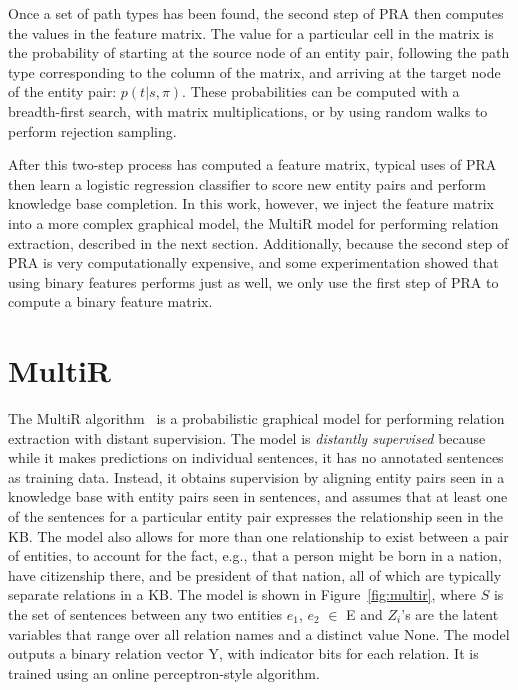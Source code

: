 \documentclass[11pt,a4paper]{article}
\newcommand{\figref}[1]{Figure~\ref{fig:#1}}
\newcommand{\pathtype}{\ensuremath{\pi}}
\begin{document}
Once a set of path types has been found, the second step of PRA then computes
the values in the feature matrix.  The value for a particular cell in the
matrix is the probability of starting at the source node of an entity pair,
following the path type corresponding to the column of the matrix, and arriving
at the target node of the entity pair: $p(t|s,\pathtype)$.  These probabilities
can be computed with a breadth-first search, with matrix multiplications, or by
using random walks to perform rejection sampling.

After this two-step process has computed a feature matrix, typical uses of PRA
then learn a logistic regression classifier to score new entity pairs and
perform knowledge base completion.  In this work, however, we inject the
feature matrix into a more complex graphical model, the MultiR model for
performing relation extraction, described in the next section.  Additionally,
because the second step of PRA is very computationally expensive, and some
experimentation showed that using binary features performs just as well, we
only use the first step of PRA to compute a binary feature matrix.

\section{MultiR}

The MultiR algorithm~\cite{hoffmann-2011-distant-supervision} is a
probabilistic graphical model for performing relation extraction with distant
supervision.  The model is \emph{distantly supervised} because while it makes
predictions on individual sentences, it has no annotated sentences as training
data.  Instead, it obtains supervision by aligning entity pairs seen in a
knowledge base with entity pairs seen in sentences, and assumes that at least
one of the sentences for a particular entity pair expresses the relationship
seen in the KB.  The model also allows for more than one relationship to exist
between a pair of entities, to account for the fact, e.g., that a person might
be born in a nation, have citizenship there, and be president of that nation,
all of which are typically separate relations in a KB.  The model is shown in
\figref{multir}, where $S$ is the set of sentences between any two entities
$e_1$, $e_2$ $\in$ E and $Z_i$'s are the latent variables that range over all
relation names and a distinct value None. The model outputs a binary relation
vector Y, with indicator bits for each relation.  It is trained using an online
perceptron-style algorithm.
\end{document}
